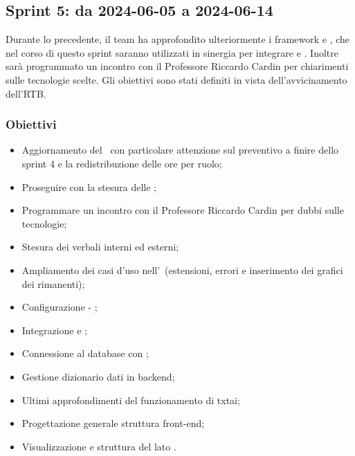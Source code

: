 \subsection{Sprint 5: da 2024-06-05 a 2024-06-14}
\par Durante lo  precedente, il team ha approfondito ulteriormente i framework  e , che nel corso di questo sprint saranno utilizzati in sinergia per integrare  e .
Inoltre sarà programmato un incontro con il Professore Riccardo Cardin per chiarimenti sulle tecnologie scelte. Gli obiettivi sono stati definiti in vista dell'avvicinamento dell'RTB. 

\subsubsection{Obiettivi}
\begin{itemize}
  \item Aggiornamento del \PdP\ con particolare attenzione sul preventivo a finire dello sprint 4 e la redistribuzione delle ore per ruolo;
  \item Proseguire con la stesura delle \NdP;
  \item Programmare un incontro con il Professore Riccardo Cardin per dubbi sulle tecnologie;
  \item Stesura dei verbali interni ed esterni;
  \item Ampliamento dei casi d'uso nell'\AdR\ (estensioni, errori e inserimento dei grafici dei  rimanenti);
  \item Configurazione  - ;
  \item Integrazione  e ;
  \item Connessione al database con ;
  \item Gestione  dizionario dati in backend;
  \item Ultimi approfondimenti del funzionamento di txtai;
  \item Progettazione generale struttura front-end;
  \item Visualizzazione  e struttura del  lato .
\end{itemize}

